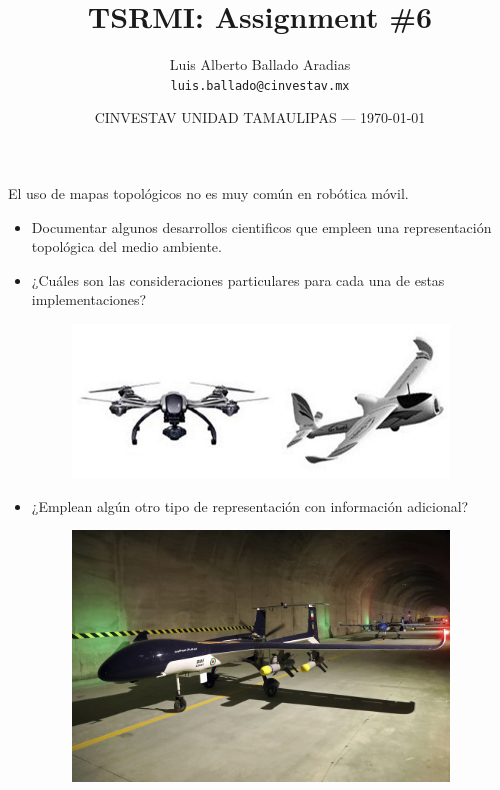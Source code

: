 \documentclass{article}
\title{TSRMI: Assignment \#6} %
\author{Luis Alberto Ballado Aradias\\ \texttt{luis.ballado@cinvestav.mx}} %
\date{CINVESTAV UNIDAD TAMAULIPAS --- \today} %
\begin{document}
\maketitle %

El uso de mapas topológicos no es muy común en robótica móvil.\\

\begin{itemize} %
\item Documentar algunos desarrollos cientificos que empleen una representación topológica del medio ambiente.
\item {¿Cuáles son las consideraciones particulares para cada una de estas implementaciones?} %

\begin{figure}[h]
\includegraphics[width=10cm]{images/vant.jpg}
\centering
\end{figure}

\item {¿Emplean algún otro tipo de representación con información adicional?}

\begin{figure}[h]
\includegraphics[width=10cm]{images/drone_alafija.jpg}
\centering
\end{figure}

\end{itemize}

\end{document}
